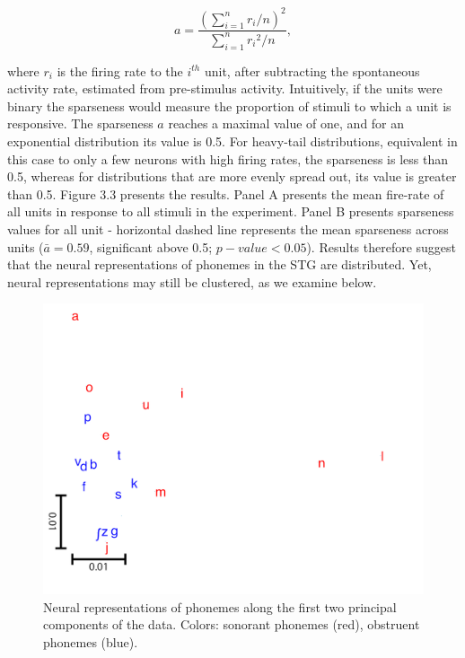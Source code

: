 \begin{equation}
    a = \frac{(\sum_{i=1}^n{r_i/n})^2}{\sum_{i=1}^n{{r_i}^2/n}},
\end{equation}

where $r_i$ is the firing rate to the $i^{th}$ unit, after subtracting the spontaneous activity rate, estimated from pre-stimulus activity. Intuitively, if the units were binary the sparseness would measure the proportion of stimuli to which a unit is responsive. The sparseness $a$ reaches a maximal value of one, and for an exponential distribution its value is 0.5. For heavy-tail distributions, equivalent in this case to only a few neurons with high firing rates, the sparseness is less than 0.5, whereas for distributions that are more evenly spread out, its value is greater than 0.5. Figure 3.3 presents the results. Panel A presents the mean fire-rate of all units in response to all stimuli in the experiment. Panel B presents sparseness values for all unit - horizontal dashed line represents the mean sparseness across units ($\bar{a}=0.59$, significant above 0.5; $p-value < 0.05$). Results therefore suggest that the neural representations of phonemes in the STG are distributed. Yet, neural representations may still be clustered, as we examine below.

\begin{figure}[h!]
\vspace{.3in}
\includegraphics[width=\linewidth]{Figures/Ch3/figure4_A.png}
\caption{Neural representations of phonemes along the first two principal components of the data. Colors: sonorant phonemes (red), obstruent phonemes (blue).}
\end{figure}

